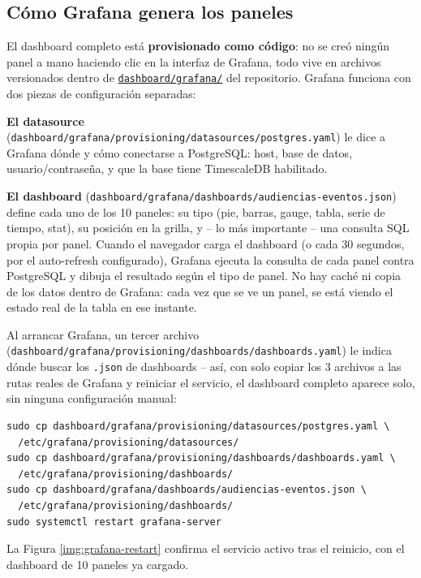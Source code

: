 \subsection{Cómo Grafana genera los paneles}

El dashboard completo está \textbf{provisionado como código}: no se creó ningún panel a mano haciendo clic en la interfaz de Grafana, todo vive en archivos versionados dentro de \href{https://github.com/Noodle96/Big_Data/tree/main/digital-audience-streaming-platform/dashboard/grafana}{\texttt{dashboard/grafana/}} del repositorio. Grafana funciona con dos piezas de configuración separadas:

\textbf{El datasource} (\texttt{dashboard/grafana/provisioning/datasources/postgres.yaml}) le dice a Grafana dónde y cómo conectarse a PostgreSQL: host, base de datos, usuario/contraseña, y que la base tiene TimescaleDB habilitado.

\textbf{El dashboard} (\texttt{dashboard/grafana/dashboards/audiencias-eventos.json}) define cada uno de los 10 paneles: su tipo (pie, barras, gauge, tabla, serie de tiempo, stat), su posición en la grilla, y -- lo más importante -- una consulta SQL propia por panel. Cuando el navegador carga el dashboard (o cada 30 segundos, por el auto-refresh configurado), Grafana ejecuta la consulta de cada panel contra PostgreSQL y dibuja el resultado según el tipo de panel. No hay caché ni copia de los datos dentro de Grafana: cada vez que se ve un panel, se está viendo el estado real de la tabla en ese instante.

Al arrancar Grafana, un tercer archivo (\texttt{dashboard/grafana/provisioning/dashboards/dashboards.yaml}) le indica dónde buscar los \texttt{.json} de dashboards -- así, con solo copiar los 3 archivos a las rutas reales de Grafana y reiniciar el servicio, el dashboard completo aparece solo, sin ninguna configuración manual:

\begin{lstlisting}[style=cmdbox]
sudo cp dashboard/grafana/provisioning/datasources/postgres.yaml \
  /etc/grafana/provisioning/datasources/
sudo cp dashboard/grafana/provisioning/dashboards/dashboards.yaml \
  /etc/grafana/provisioning/dashboards/
sudo cp dashboard/grafana/dashboards/audiencias-eventos.json \
  /etc/grafana/provisioning/dashboards/
sudo systemctl restart grafana-server
\end{lstlisting}

La Figura \ref{img:grafana-restart} confirma el servicio activo tras el reinicio, con el dashboard de 10 paneles ya cargado.

